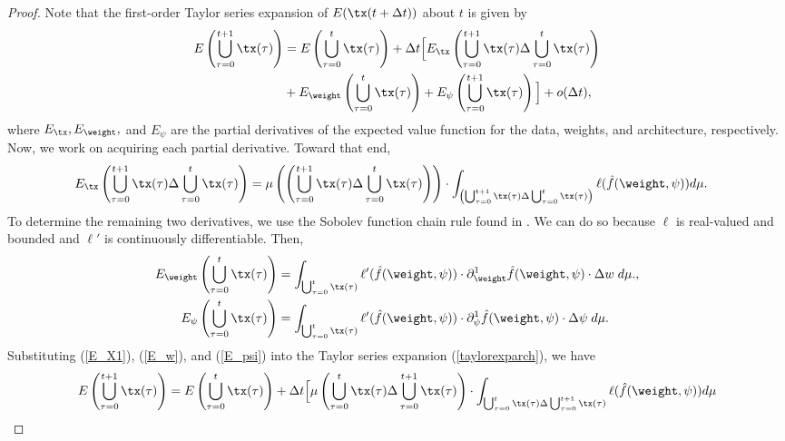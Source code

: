 \begin{proof}
    Note that the first-order Taylor series expansion of $E(\tx(t+\Delta t))$ about  $t$ is given by
    \begin{align}
        E\left(\bigcup_{\tau = 0}^{t+1}\tx(\tau)\right) & = E\left(\bigcup_{\tau = 0}^{t}\tx(\tau)\right) + \Delta t\Big[ E_{\tx} \left(\bigcup_{\tau = 0}^{t+1}\tx(\tau)\Delta \bigcup_{\tau = 0}^{t}\tx(\tau)\right) \nonumber \\
        & + E_{\weight}\left(\bigcup_{\tau = 0}^{t}\tx(\tau)\right) + E_\psi\left(\bigcup_{\tau = 0}^{t+1}\tx(\tau)\right)\Big] + o(\Delta t),\label{taylorexparch}
    \end{align}
    where $E_{\tx} , E_{\weight},$ and $E_\psi$ are the partial derivatives of the expected value function for the data, weights, and architecture, respectively. Now, we work on acquiring each partial derivative. Toward that end, 
    \begin{align}
        E_{\tx} \left(\bigcup_{\tau = 0}^{t+1}\tx(\tau)\Delta \bigcup_{\tau = 0}^{t}\tx(\tau)\right) & =\mu\left( \left(\bigcup_{\tau = 0}^{t+1}\tx(\tau)\Delta \bigcup_{\tau = 0}^{t}\tx(\tau)\right)\right)\cdot \displaystyle\int_{\left(\bigcup_{\tau = 0}^{t+1}\tx(\tau)\Delta \bigcup_{\tau = 0}^{t}\tx(\tau)\right)} \ell(\hat{f}(\weight,\psi))d\mu.\label{E_X1}
    \end{align}
    To determine the remaining two derivatives, we use the Sobolev function chain rule found in \cite{evans2022partial}. We can do so because $\ell$ is real-valued and bounded and $\ell'$ is continuously differentiable. Then,
    \begin{align}
        E_{\weight}\left(\bigcup_{\tau = 0}^{t}\tx(\tau)\right) & = \displaystyle\int_{\bigcup_{\tau = 0}^{t}\tx(\tau)} \ell'(\hat{f}(\weight,\psi))\cdot \partial_{\weight}^1 \hat{f}(\weight,\psi)\cdot \Delta w \hspace{1mm}  d\mu.\label{E_w},\\
        E_{\psi}\left(\bigcup_{\tau = 0}^{t}\tx(\tau)\right) & = \displaystyle\int_{\bigcup_{\tau = 0}^{t}\tx(\tau)} \ell'(\hat{f}(\weight,\psi))\cdot \partial_\psi^1 \hat{f}(\weight,\psi)\cdot \Delta \psi \hspace{1mm}  d\mu.\label{E_psi}
    \end{align}
    Substituting (\ref{E_X1}), (\ref{E_w}), and (\ref{E_psi}) into the Taylor series expansion (\ref{taylorexparch}), we have
    \begin{align*}
        E\left(\bigcup_{\tau = 0}^{t+1}\tx(\tau)\right) & = E\left(\bigcup_{\tau = 0}^{t}\tx(\tau)\right) + \Delta t\Big[\mu\left( \bigcup_{\tau = 0}^{t}\tx(\tau)\Delta \bigcup_{\tau = 0}^{t+1}\tx(\tau)\right)\cdot \displaystyle\int_{\bigcup_{\tau = 0}^{t}\tx(\tau)\Delta \bigcup_{\tau = 0}^{t+1}\tx(\tau)} \ell(\hat{f}(\weight,\psi))d\mu\\

\end{align*}
\end{proof}
